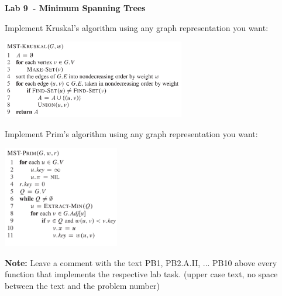 \documentclass{exam}
\newcommand\labnr{9}
\newcommand\lab{Lab \labnr\ - Minimum Spanning Trees}
\begin{document}
\begin{center}
    \vspace*{0cm}
    \bfseries\LARGE
    \lab
    \vspace*{1cm}
\end{center}


\begin{questions}
\question Implement Kruskal's algorithm using any graph representation you want: \cite{cormen2022introduction}

\includegraphics[width=0.6\textwidth]{diagrams/kruskal.png}



\question Implement Prim's algorithm using any graph representation you want: \cite{cormen2022introduction}

\includegraphics[width=0.38\textwidth]{diagrams/prim.png}

\end{questions}

 \bigskip
\textbf{Note:} Leave a comment with the text PB1, PB2.A.II, ... PB10 above every function that implements the respective lab task. (upper case text, no space between the text and the problem number)

\medskip
\printbibliography
\end{document}
